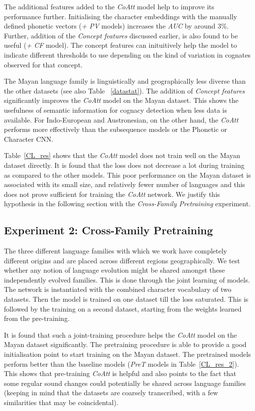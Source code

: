 \documentclass[11pt,letterpaper]{article}
\begin{document}
The additional features added to the \textit{CoAtt} model help to improve its performance further. Initialising the character embeddings with the manually defined phonetic vectors (\textit{+ PV} models) increases the \textit{AUC} by around 3\%. Further, addition of the \textit{Concept features} discussed earlier, is also found to be useful (\textit{+ CF} model). The concept features can inituitively help the model to indicate different thresholds to use depending on the kind of variation in cognates observed for that concept. 

The Mayan language family is linguistically and geographically less diverse than the other datasets (see also Table ~\ref{datastat}). The addition of \textit{Concept features} significantly improves the \textit{CoAtt} model on the Mayan dataset. This shows the usefulness of semantic information for cognacy detection when less data is available. For Indo-European and Austronesian, on the other hand, the \textit{CoAtt} performs more effectively than the subsequence models or the Phonetic or Character CNN. 

Table~\ref{CL_res} shows that the \textit{CoAtt} model does not train well on the Mayan dataset directly. It is found that the loss does not decrease a lot during training as compared to the other models. This poor performance on the Mayan dataset is associated with its small size, and relatively fewer number of languages and this does not prove sufficient for training the \textit{CoAtt} network. 
We justify this hypothesis in the following section with the \textit{Cross-Family Pretraining} experiment.

\subsection{Experiment 2: Cross-Family Pretraining}

The three different language families with which we work have completely different origins and are placed across different regions geographically. We test whether any notion of language evolution might be shared amongst these independently evolved families. This is done through the joint learning of models. The network is instantiated with the combined character vocabulary of two datasets. Then the model is trained on one dataset till the loss saturated. This is followed by the training on a second dataset, starting from the weights learned from the pre-training. 

It is found that such a joint-training procedure helps the \textit{CoAtt} model on the Mayan dataset significantly. The pretraining procedure is able to provide a good initialisation point to start training on the Mayan dataset. The pretrained models perform better than the baseline models (\textit{PreT} models in Table~\ref{CL_res_2}). This shows that pre-training \textit{CoAtt} is helpful and also points to the fact that some regular sound changes could potentially be shared across language families (keeping in mind that the datasets are coarsely transcribed, with a few similarities that may be coincidental). 
\end{document}
